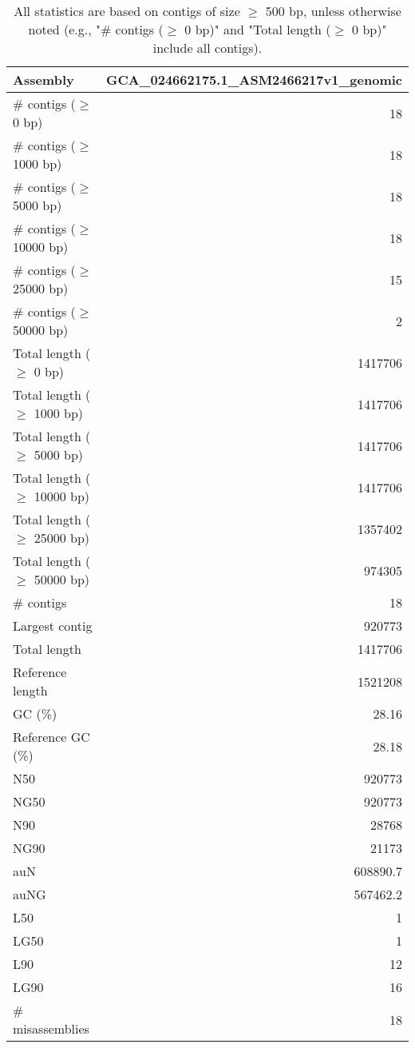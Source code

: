 \documentclass[12pt,a4paper]{article}
\begin{document}
\begin{table}[ht]
\begin{center}
\caption{All statistics are based on contigs of size $\geq$ 500 bp, unless otherwise noted (e.g., "\# contigs ($\geq$ 0 bp)" and "Total length ($\geq$ 0 bp)" include all contigs).}
\begin{tabular}{|l*{1}{|r}|}
\hline
Assembly & GCA\_024662175.1\_ASM2466217v1\_genomic \\ \hline
\# contigs ($\geq$ 0 bp) & 18 \\ \hline
\# contigs ($\geq$ 1000 bp) & 18 \\ \hline
\# contigs ($\geq$ 5000 bp) & 18 \\ \hline
\# contigs ($\geq$ 10000 bp) & 18 \\ \hline
\# contigs ($\geq$ 25000 bp) & 15 \\ \hline
\# contigs ($\geq$ 50000 bp) & 2 \\ \hline
Total length ($\geq$ 0 bp) & 1417706 \\ \hline
Total length ($\geq$ 1000 bp) & 1417706 \\ \hline
Total length ($\geq$ 5000 bp) & 1417706 \\ \hline
Total length ($\geq$ 10000 bp) & 1417706 \\ \hline
Total length ($\geq$ 25000 bp) & 1357402 \\ \hline
Total length ($\geq$ 50000 bp) & 974305 \\ \hline
\# contigs & 18 \\ \hline
Largest contig & 920773 \\ \hline
Total length & 1417706 \\ \hline
Reference length & 1521208 \\ \hline
GC (\%) & 28.16 \\ \hline
Reference GC (\%) & 28.18 \\ \hline
N50 & 920773 \\ \hline
NG50 & 920773 \\ \hline
N90 & 28768 \\ \hline
NG90 & 21173 \\ \hline
auN & 608890.7 \\ \hline
auNG & 567462.2 \\ \hline
L50 & 1 \\ \hline
LG50 & 1 \\ \hline
L90 & 12 \\ \hline
LG90 & 16 \\ \hline
\# misassemblies & 18 \\ \hline

\end{tabular}
\end{center}
\end{table}
\end{document}
